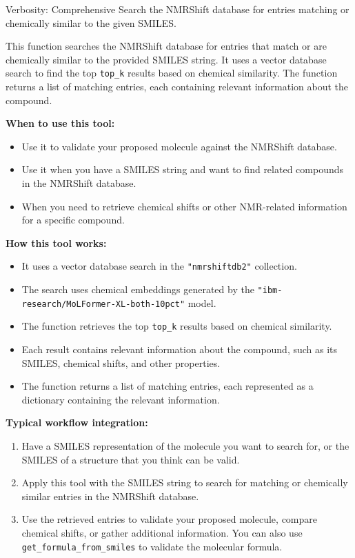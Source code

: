 \begin{hypobox}{Verbosity: Comprehensive}
    Search the NMRShift database for entries matching or chemically similar to the given SMILES.

    This function searches the NMRShift database for entries that match or are chemically similar to the provided SMILES string. It uses a vector database search to find the top
  \texttt{top\_k} results based on chemical similarity. The function returns a list of matching entries, each containing relevant information about the compound.

    \textbf{When to use this tool:}
    \begin{itemize}[nosep]
      \item Use it to validate your proposed molecule against the NMRShift database.
      \item Use it when you have a SMILES string and want to find related compounds in the NMRShift database.
      \item When you need to retrieve chemical shifts or other NMR-related information for a specific compound.
    \end{itemize}

    \textbf{How this tool works:}
    \begin{itemize}[nosep]
      \item It uses a vector database search in the \texttt{"nmrshiftdb2"} collection.
      \item The search uses chemical embeddings generated by the \texttt{"ibm-research/MoLFormer-XL-both-10pct"} model.
      \item The function retrieves the top \texttt{top\_k} results based on chemical similarity.
      \item Each result contains relevant information about the compound, such as its SMILES, chemical shifts, and other properties.
      \item The function returns a list of matching entries, each represented as a dictionary containing the relevant information.
    \end{itemize}

    \textbf{Typical workflow integration:}
    \begin{enumerate}[nosep]
      \item Have a SMILES representation of the molecule you want to search for, or the SMILES of a structure that you think can be valid.
      \item Apply this tool with the SMILES string to search for matching or chemically similar entries in the NMRShift database.
      \item Use the retrieved entries to validate your proposed molecule, compare chemical shifts, or gather additional information. You can also use \texttt{get\_formula\_from\_smiles} to
   validate the molecular formula.
    \end{enumerate}


\end{hypobox}
